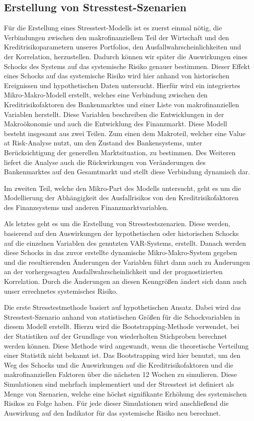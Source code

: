 \documentclass[a4paper,12pt]{scrartcl}
\begin{document}
\subsection{Erstellung von Stresstest-Szenarien}
Für die Erstellung eines Stresstest-Modells ist es zuerst einmal nötig, die Verbindungen zwischen den makrofinanziellem Teil der Wirtschaft und den Kreditrisikoparametern unseres Portfolios, den Ausfallwahrscheinlichkeiten und der Korrelation, herzustellen. Dadurch können wir später die Auswirkungen eines Schocks des Systems auf das systemische Risiko genauer bestimmen. 
Dieser Effekt eines Schocks auf das systemische Risiko wird hier anhand von historischen Ereignissen und hypothetischen Daten untersucht. Hierfür wird ein integriertes Mikro-Makro-Modell erstellt, welches eine Verbindung zwischen den Kreditrisikofaktoren des Bankenmarktes und einer Liste von makrofinanziellen Variablen herstellt. Diese Variablen beschreiben die Entwicklungen in der Makroökonomie und auch die Entwicklung des Finanzmarkt.
Diese Modell besteht insgesamt aus zwei Teilen. Zum einen dem Makroteil, welcher eine Value at Risk-Analyse nutzt, um den Zustand des Bankensystems, unter Berücksichtigung der generellen Marktsituation, zu bestimmen. Des Weiteren liefert die Analyse auch die Rückwirkungen von Veränderungen des Bankenmarktes auf den Gesamtmarkt und stellt diese Verbindung dynamisch dar.

Im zweiten Teil, welche den Mikro-Part des Modells untersucht, geht es um die Modellierung der Abhängigkeit des Ausfallrisikos von den Kreditrisikofaktoren des Finanzsystems und anderen Finanzmarktvariablen.



Als letztes geht es um die Erstellung von Stresstestszenarien. Diese werden, basierend auf den Auswirkungen der hypothetischen oder historischen Schocks auf die einzelnen Variablen des genutzten VAR-Systems, erstellt. 
Danach werden diese Schocks in das zuvor erstellte dynamische Mikro-Makro-System gegeben und die resultierenden Änderungen der Variablen führt dann auch zu Änderungen an der vorhergesagten Ausfallwahrscheinlichkeit und der prognostizierten Korrelation. Durch die Änderungen an diesen Kenngrößen ändert sich dann auch unser errechnetes systemisches Risiko. 

Die erste Stresstestmethode basiert auf hypothetischen Ansatz. Dabei wird das Stresstest-Szenario anhand von statistischen Größen für die Schockvariablen in diesem Modell erstellt. Hierzu wird die Bootstrapping-Methode verwendet, bei der Statistiken auf der Grundlage von wiederholten Stichproben berechnet werden können. Diese Methode wird angewandt, wenn die theoretische Verteilung einer Statistik nicht bekannt ist.
Das Bootstrapping wird hier benutzt, um den Weg des Schocks und die Auswirkungen auf die Kreditrisikofaktoren und die makrofinanziellen Faktoren über die nächsten 12 Wochen zu simulieren. 
Diese Simulationen sind mehrfach implementiert und der Stresstest ist definiert als Menge von Szenarien, welche eine höchst signifikante Erhöhung des systemischen Risikos zu Folge haben.
Für jede dieser Simulationen wird anschließend die Auswirkung auf den Indikator für das systemische Risiko neu berechnet. 
\end{document}
